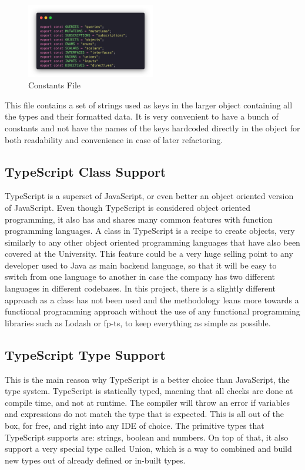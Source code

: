 \begin{figure}[H]
  \centering
  \includegraphics[width=0.5\textwidth]{figures/code/constants.png}
  \caption{Constants File}
  \label{f:ch5-refactored-constants-and-types}
\end{figure}

This file contains a set of strings used as keys in the larger object containing
all the types and their formatted data. It is very convenient to have a bunch of
constants and not have the names of the keys hardcoded directly in the object
for both readability and convenience in case of later refactoring.

\subsection{TypeScript Class Support}
\label{ss:TypeScript-Class-Support}
TypeScript is a superset of JavaScript, or even better an object oriented
version of JavaScript. Even though TypeScript is considered object oriented
programming, it also has and shares many common features with function
programming languages. A class in TypeScript is a recipe to create objects, very
similarly to any other object oriented programming languages that have also been
covered at the University. This feature could be a very huge selling point to
any developer used to Java as main backend language, so that it will be easy to
switch from one language to another in case the company has two different
languages in different codebases. In this project, there is a slightly different
approach as a class has not been used and the methodology leans more towards
a functional programming approach without the use of any functional programming
libraries such as Lodash or fp-ts, to keep everything as simple as possible.

\subsection{TypeScript Type Support}
\label{ss:TypeScript-Type-Support}
This is the main reason why TypeScript is a better choice than JavaScript, the
type system. TypeScript is statically typed, maening that all checks are done
at compile time, and not at runtime. The compiler will throw an error if variables
and expressions do not match the type that is expected. This is all out of the box,
for free, and right into any IDE of choice.
The primitive types that TypeScript supports are: strings, boolean and numbers.
On top of that, it also support a very special type called Union, which is a way
to combined and build new types out of already defined or in-built types.

